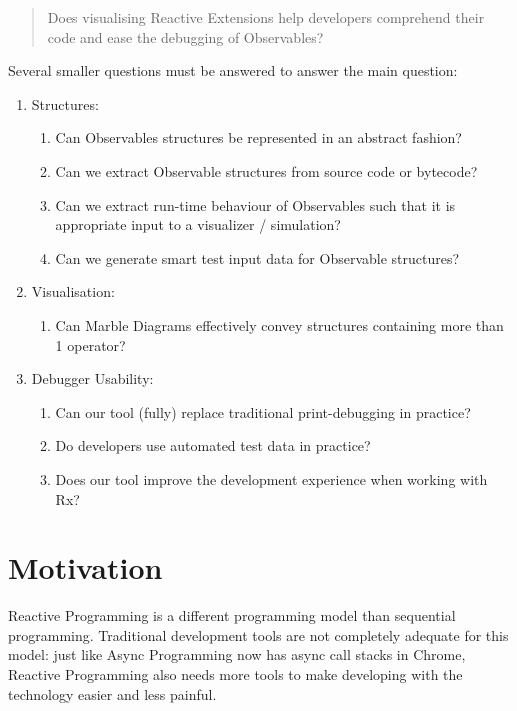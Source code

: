 \documentclass[11pt,a4paper]{article}
\begin{document}
\begin{quotation}
	\noindent
	Does visualising Reactive Extensions help developers comprehend their code and ease the debugging of Observables?
\end{quotation}

\noindent 
Several smaller questions must be answered to answer the main question:

\begin{enumerate}
	
\item Structures:
\begin{enumerate}
	\item Can Observables structures be represented in an abstract fashion?
	\item Can we extract Observable structures from source code or bytecode?
	\item Can we extract run-time behaviour of Observables such that it is appropriate input to a visualizer / simulation?
	\item Can we generate smart test input data for Observable structures?
\end{enumerate}

\item Visualisation:
\begin{enumerate}
	\item Can Marble Diagrams effectively convey structures containing more than 1 operator?
\end{enumerate}

\item Debugger Usability:
\begin{enumerate}
	\item Can our tool (fully) replace traditional print-debugging in practice?
	\item Do developers use automated test data in practice?
	\item Does our tool improve the development experience when working with Rx?
\end{enumerate}

\end{enumerate}


\section{Motivation}
Reactive Programming is a different programming model than sequential programming. Traditional development tools are not completely adequate for this model: just like Async Programming now has async call stacks in Chrome, Reactive Programming also needs more tools to make developing with the technology easier and less painful. 
\end{document}
